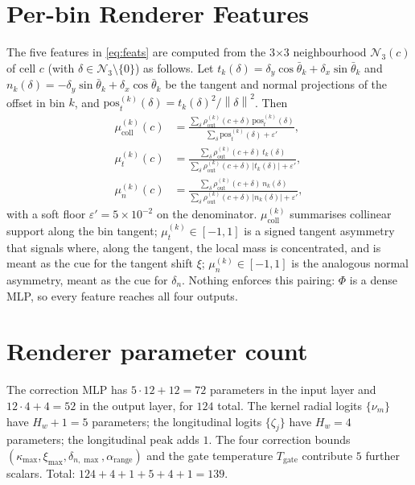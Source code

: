 \documentclass[11pt,a4paper]{article}
\newcommand{\norm}[1]{\left\lVert#1\right\rVert}
\newcommand{\abs}[1]{\left\lvert#1\right\rvert}
\begin{document}
\appendix

\section{Per-bin Renderer Features}\label{app:feats}

The five features in \cref{eq:feats} are computed from the 3$\times$3 neighbourhood $\mathcal{N}_3(c)$ of cell $c$ (with $\delta \in \mathcal{N}_3 \setminus \{0\}$) as follows. Let $t_k(\delta) = \delta_y \cos\bar\theta_k + \delta_x \sin\bar\theta_k$ and $n_k(\delta) = -\delta_y \sin\bar\theta_k + \delta_x \cos\bar\theta_k$ be the tangent and normal projections of the offset in bin $k$, and $\mathrm{pos}_t^{(k)}(\delta) = t_k(\delta)^2/\norm{\delta}^2$. Then
\begin{align}
  \mu^{(k)}_{\mathrm{coll}}(c) &= \frac{\sum_\delta \rho_{\mathrm{out}}^{(k)}(c+\delta)\,\mathrm{pos}_t^{(k)}(\delta)}
                                       {\sum_\delta \mathrm{pos}_t^{(k)}(\delta) + \varepsilon'}, \\
  \mu^{(k)}_t(c) &= \frac{\sum_\delta \rho_{\mathrm{out}}^{(k)}(c+\delta)\, t_k(\delta)}
                          {\sum_\delta \rho_{\mathrm{out}}^{(k)}(c+\delta)\, \abs{t_k(\delta)} + \varepsilon'}, \\
  \mu^{(k)}_n(c) &= \frac{\sum_\delta \rho_{\mathrm{out}}^{(k)}(c+\delta)\, n_k(\delta)}
                          {\sum_\delta \rho_{\mathrm{out}}^{(k)}(c+\delta)\, \abs{n_k(\delta)} + \varepsilon'},
\end{align}
with a soft floor $\varepsilon' = 5\times 10^{-2}$ on the denominator. $\mu^{(k)}_{\mathrm{coll}}$ summarises collinear support along the bin tangent; $\mu^{(k)}_t \in [-1, 1]$ is a signed tangent asymmetry that signals where, along the tangent, the local mass is concentrated, and is meant as the cue for the tangent shift $\xi$; $\mu^{(k)}_n \in [-1, 1]$ is the analogous normal asymmetry, meant as the cue for $\delta_n$. Nothing enforces this pairing: $\Phi$ is a dense MLP, so every feature reaches all four outputs.

\section{Renderer parameter count}\label{app:render-count}

The correction MLP has $5 \cdot 12 + 12 = 72$ parameters in the input layer and $12 \cdot 4 + 4 = 52$ in the output layer, for $124$ total. The kernel radial logits $\{\nu_m\}$ have $H_w + 1 = 5$ parameters; the longitudinal logits $\{\zeta_j\}$ have $H_w = 4$ parameters; the longitudinal peak adds $1$. The four correction bounds $(\kappa_{\max}, \xi_{\max}, \delta_{n,\max}, \alpha_{\mathrm{range}})$ and the gate temperature $T_{\mathrm{gate}}$ contribute $5$ further scalars. Total: $124 + 4 + 1 + 5 + 4 + 1 = 139$.
\end{document}
